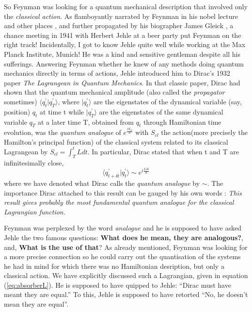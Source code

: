 \documentclass[12pt]{article}
\newcommand{\be}{\begin{equation}}
\newcommand{\ee}{\end{equation}}
\begin{document}
So Feynman was looking for a quantum mechanical description that involved only the {\it classical action}. As flamboyantly narrated by 
Feynman in his nobel lecture \cite{nobel} and other places \cite{joking}, and further propagated by his biographer
James Gleick \cite{gleick}, a chance meeting in 1941 with Herbert Jehle at a beer party put Feynman on the right track! Incidentally, 
I got to know Jehle quite well while working at the Max Planck Institute, Munich! He was a kind and sensitive gentleman despite all his 
sufferings. Answering Feynman whether he knew of any methods doing quantum mechanics directly in terms of actions, Jehle introduced him to 
Dirac's 1932 paper {\it The Lagrangean in Quantum Mechanics}\cite{diracpaper}. In that classic paper, Dirac had shown that the
quantum mechanical amplitude (also called the {\it propagator} sometimes) $ \langle q^\prime_t|q^\prime_T\rangle $,
where $|q^\prime_t\rangle$ are the eigenstates of the dynamical variable (say, position) $q_t$ at time t while $|q^\prime_T\rangle$
are the eigenstates of the same dynamical variable $q_T$ at a later time T, obtained from $q_t$ through Hamiltonian time evolution, was
the {\it quantum analogue} of $ e^{\frac{iS_{cl}}{\hbar}} $ with $S_{cl}$ the action(more precisely the Hamilton's principal function) of the 
classical system related to its classical Lagrangean by $ S_{cl} = \int_T^{t}L dt $. In particular, Dirac stated that when t and T are 
infinitesimally close,
\be
\label{eq:qanalogue}
\langle q^\prime_{t+\delta t}|q^\prime_t\rangle \sim  e^{i \frac {L \delta t}{\hbar}}
\ee
where we have denoted what Dirac calls the {\it quantum analogue} by $\sim$. The importance Dirac attached to this result can be gauged
by his own words \cite{diracbook2}: {\it This result gives probably the most fundamental quantum analogue for the classical Lagrangian 
function.}

Feynman was perplexed by the word {\it analogue} and he is supposed to have asked Jehle the two famous questions:
{\bf What does he mean, they are analogous?}, and, {\bf What is the use of that}? As already mentioned,
Feynman was looking for a more precise connection so he could carry out the quantisation of the systems he had in mind for which
there was no Hamiltonian desription, but only a classical action. We have explicitly discussed such a Lagrangian, given in 
equation (\ref{eq:absorberL}). He is supposed to have quipped to Jehle: ``Dirac must have meant they are
equal.'' To this, Jehle is supposed to have retorted ``No, he doesn't mean they are equal''.  
\end{document}
